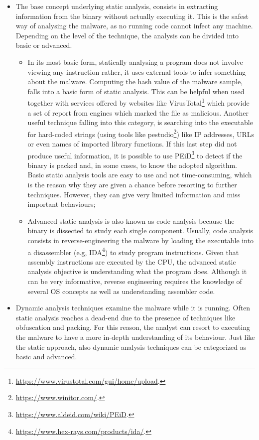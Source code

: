 \documentclass[LaM,binding=0.6cm]{sapthesis}
\begin{document}
\begin{itemize}
\item The base concept underlying static analysis, consists in extracting information from the binary without actually executing it. This is the safest way of analysing the malware, as no running code cannot infect any machine. Depending on the level of the technique, the analysis can be divided into basic or advanced.
\begin{itemize}
\item In its most basic form, statically analysing a program does not involve viewing any instruction rather, it uses external tools to infer something about the malware. Computing the hash value of the malware sample, falls into a basic form of static analysis. This can be helpful when used together with services offered by websites like VirusTotal\footnote{\url{https://www.virustotal.com/gui/home/upload}.} which provide a set of report from engines which marked the file as malicious. Another useful technique falling into this category, is searching into the executable for hard-coded strings (using tools like pestudio\footnote{\url{https://www.winitor.com/}.}) like IP addresses, URLs or even names of imported library functions. If this last step did not produce useful information, it is possible to use PEiD\footnote{\url{https://www.aldeid.com/wiki/PEiD}.} to detect if the binary is packed and, in some cases, to know the adopted algorithm. Basic static analysis tools are easy to use and not time-consuming, which is the reason why they are given a chance before resorting to further techniques. However, they can give very limited information and miss important behaviours;
\item Advanced static analysis is also known as code analysis because the binary is dissected to study each single component. Usually, code analysis consists in reverse-engineering the malware by loading the executable into a disassembler (e.g, IDA\footnote{\url{https://www.hex-rays.com/products/ida/}.}) to study program instructions. Given that assembly instructions are executed by the CPU, the advanced static analysis objective is understanding what the program does. Although it can be very informative, reverse engineering requires the knowledge of several OS concepts as well as understanding assembler code.
\end{itemize}
\item Dynamic analysis techniques examine the malware while it is running. Often static analysis reaches a dead-end due to the presence of techniques like obfuscation and packing. For this reason, the analyst can resort to executing the malware to have a more in-depth understanding of its behaviour. Just like the static approach, also dynamic analysis techniques can be categorized as basic and advanced.

\end{itemize}
\end{document}
